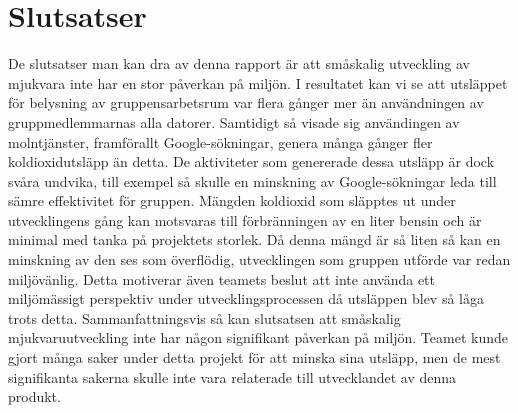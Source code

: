 \section{Slutsatser}
\label{sec:joel_a-conclusion}

De slutsatser man kan dra av denna rapport är att småskalig utveckling av mjukvara inte har en stor påverkan på miljön. I resultatet kan vi se att  utsläppet för belysning av gruppensarbetsrum var flera gånger mer än användningen av gruppmedlemmarnas alla datorer. Samtidigt så visade sig användingen av molntjänster, framförallt Google-sökningar, genera många gånger fler koldioxidutsläpp än detta. De aktiviteter som genererade dessa utsläpp är dock svåra undvika, till exempel så skulle en minskning av Google-sökningar leda till sämre effektivitet för gruppen. Mängden koldioxid som släpptes ut under utvecklingens gång kan motsvaras till förbränningen av en liter bensin och är minimal med tanka på projektets storlek. Då denna mängd är så liten så kan en minskning av den ses som överflödig, utvecklingen som gruppen utförde var redan miljövänlig. Detta motiverar även teamets beslut att inte använda ett miljömässigt perspektiv under utvecklingsprocessen då utsläppen blev så låga trots detta. Sammanfattningsvis så kan slutsatsen att småskalig mjukvaruutveckling inte har någon signifikant påverkan på miljön. Teamet kunde gjort många saker under detta projekt för att minska sina utsläpp, men de mest signifikanta sakerna skulle inte vara relaterade till utvecklandet av denna produkt. 


